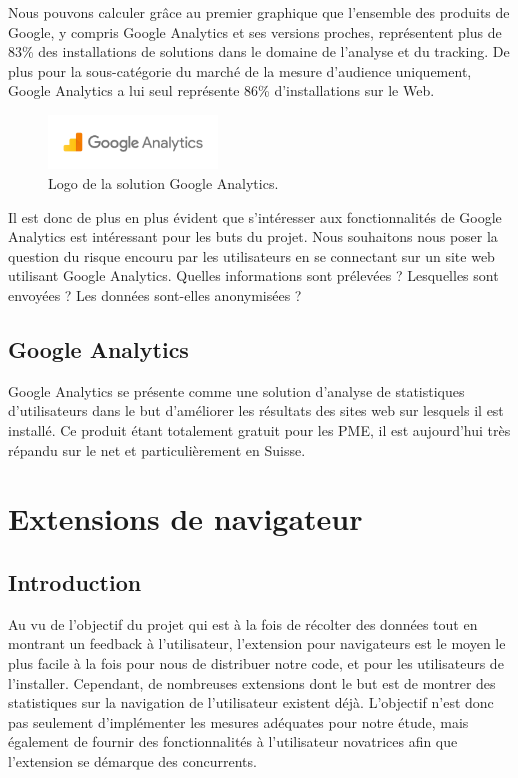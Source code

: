 		Nous pouvons calculer grâce au premier graphique que l'ensemble des produits de Google, y compris Google Analytics et ses versions proches, représentent plus de 83\% des installations de solutions dans le domaine de l'analyse et du tracking. De plus pour la sous-catégorie du marché de la mesure d'audience uniquement, Google Analytics a lui seul représente 86\% d'installations sur le Web.

		\begin{figure}[ht]
			\centering
			\includegraphics[width=0.4\textwidth]{images/analysis/analytics}
			\caption{Logo de la solution Google Analytics\cite{analytics}.}
			\label{a-analytics}
		\end{figure}

		Il est donc de plus en plus évident que s'intéresser aux fonctionnalités de Google Analytics est intéressant pour les buts du projet. Nous souhaitons nous poser la question du risque encouru par les utilisateurs en se connectant sur un site web utilisant Google Analytics. Quelles informations sont prélevées ? Lesquelles sont envoyées ? Les données sont-elles anonymisées ?

	\subsection{Google Analytics}

		Google Analytics se présente comme une solution d'analyse de statistiques d'utilisateurs dans le but d'améliorer les résultats des sites web sur lesquels il est installé. Ce produit étant totalement gratuit pour les PME, il est aujourd'hui très répandu sur le net et particulièrement en Suisse\cite{analytics-usage}.

\section{Extensions de navigateur}

	\subsection{Introduction}

		Au vu de l'objectif du projet qui est à la fois de récolter des données tout en montrant un feedback à l'utilisateur, l'extension pour navigateurs est le moyen le plus facile à la fois pour nous de distribuer notre code, et pour les utilisateurs de l'installer. Cependant, de nombreuses extensions dont le but est de montrer des statistiques sur la navigation de l'utilisateur existent déjà. L'objectif n'est donc pas seulement d'implémenter les mesures adéquates pour notre étude, mais également de fournir des fonctionnalités à l'utilisateur novatrices afin que l'extension se démarque des concurrents.

